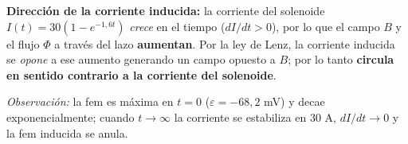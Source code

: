 \documentclass[12pt,letterpaper]{article}
\newcommand{\eps}{\varepsilon}
\begin{document}
\medskip
\noindent\textbf{Direcci\'on de la corriente inducida:} la corriente del solenoide
$I(t)=30(1-e^{-1{,}6t})$ \emph{crece} en el tiempo ($dI/dt>0$), por lo que el campo $B$ y el flujo
$\Phi$ a trav\'es del lazo \textbf{aumentan}. Por la ley de Lenz, la corriente inducida se
\emph{opone} a ese aumento generando un campo opuesto a $B$; por lo tanto \textbf{circula en sentido
contrario a la corriente del solenoide}.

\medskip
\noindent\small\textit{Observaci\'on:} la fem es m\'axima en $t=0$ ($\eps=-68{,}2$ mV) y decae
exponencialmente; cuando $t\to\infty$ la corriente se estabiliza en $30$ A, $dI/dt\to 0$ y la fem
inducida se anula.\normalsize
\end{document}
